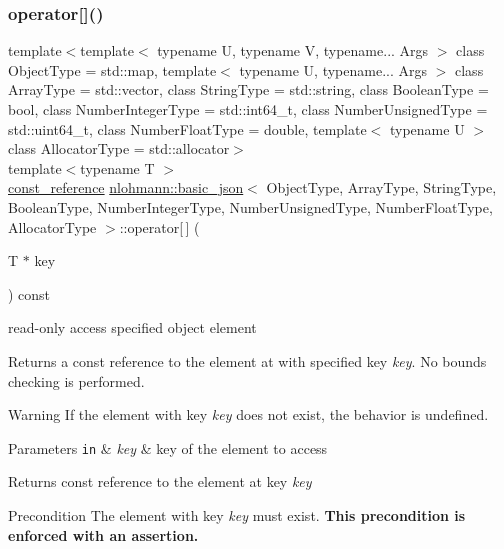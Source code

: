 \subsubsection{\texorpdfstring{operator[]()}{operator[]()}\hspace{0.1cm}{\footnotesize\ttfamily [8/10]}}
{\footnotesize\ttfamily template$<$template$<$ typename U, typename V, typename... Args $>$ class Object\+Type = std\+::map, template$<$ typename U, typename... Args $>$ class Array\+Type = std\+::vector, class String\+Type  = std\+::string, class Boolean\+Type  = bool, class Number\+Integer\+Type  = std\+::int64\+\_\+t, class Number\+Unsigned\+Type  = std\+::uint64\+\_\+t, class Number\+Float\+Type  = double, template$<$ typename U $>$ class Allocator\+Type = std\+::allocator$>$ \\
template$<$typename T $>$ \\
\hyperlink{classnlohmann_1_1basic__json_af677a29b0e66edc9f66e5167e4667071}{const\+\_\+reference} \hyperlink{classnlohmann_1_1basic__json}{nlohmann\+::basic\+\_\+json}$<$ Object\+Type, Array\+Type, String\+Type, Boolean\+Type, Number\+Integer\+Type, Number\+Unsigned\+Type, Number\+Float\+Type, Allocator\+Type $>$\+::operator\mbox{[}$\,$\mbox{]} (\begin{DoxyParamCaption}\item[{T $\ast$}]{key }\end{DoxyParamCaption}) const\hspace{0.3cm}{\ttfamily [inline]}}



read-\/only access specified object element 

Returns a const reference to the element at with specified key {\itshape key}. No bounds checking is performed.

\begin{DoxyWarning}{Warning}
If the element with key {\itshape key} does not exist, the behavior is undefined.
\end{DoxyWarning}

\begin{DoxyParams}[1]{Parameters}
\mbox{\tt in}  & {\em key} & key of the element to access\\
\hline
\end{DoxyParams}
\begin{DoxyReturn}{Returns}
const reference to the element at key {\itshape key} 
\end{DoxyReturn}
\begin{DoxyPrecond}{Precondition}
The element with key {\itshape key} must exist. {\bfseries This precondition is enforced with an assertion.}
\end{DoxyPrecond}

